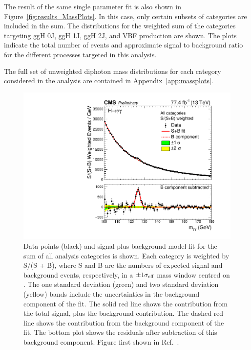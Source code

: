The result of the same single parameter fit is also shown in Figure~\ref{fig:results_MassPlots}.
In this case, only certain subsets of categories are included in the sum.
The \mgg distributions for the weighted sum of the categories targeting 
ggH 0J, ggH 1J, ggH 2J, and VBF production are shown.
The plots indicate the total number of events and approximate signal to background ratio
for the different processes targeted in this analysis.

The full set of unweighted diphoton mass distributions for each category 
considered in the analysis are contained in Appendix~\ref{app:massplots}.

\begin{figure}[hptb]
  \centering
  \includegraphics[width=\textwidth]{Figures/Results/MassPlot.pdf}
  \caption[Signal plus background fit to data, summed over all analysis categories.]
  {
    Data points (black) and signal plus background model fit 
    for the sum of all analysis categories is shown. 
    Each category is weighted by S/(S + B), 
    where S and B are the numbers of expected signal and background events, respectively, 
    in a $\pm 1 \sigma_{\text{eff}}$ mass window centred on \mH. 
    The one standard deviation (green) and two standard deviation (yellow) bands 
    include the uncertainties in the background component of the fit. 
    The solid red line shows the contribution from the total signal, plus the background contribution. 
    The dashed red line shows the contribution from the background component of the fit. 
    The bottom plot shows the residuals after subtraction of this background component.
    Figure first shown in Ref.~\cite{HIG-18-029}.
  }
  \label{fig:results_MassPlot}
\end{figure}

